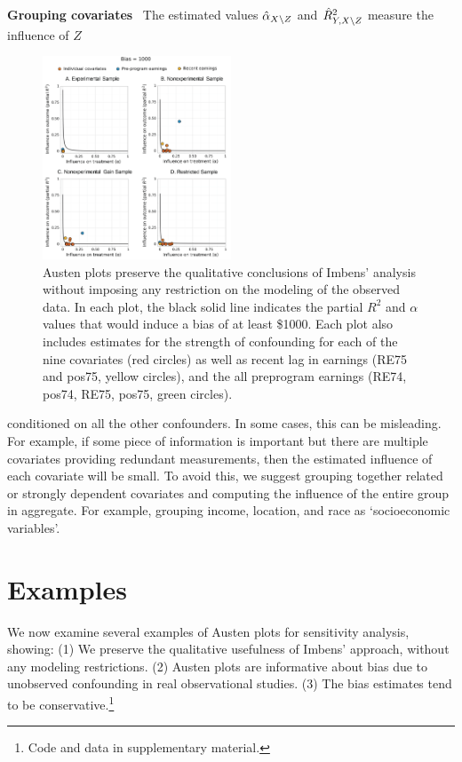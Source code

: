 \documentclass{article}
\DeclareRobustCommand{\parhead}[1]{\textbf{#1}~}
\begin{document}
\parhead{Grouping covariates} The estimated values $\hat{\alpha}_{X\backslash Z}$ and $\hat{R}_{Y,X\backslash Z}^{2}$ measure the influence of $Z$
\begin{figure}
   \vspace{-5pt}
  \begin{center}
    \includegraphics[width=0.5\textwidth]{figures/imbens_att.png}
  \end{center}
  \vspace{-5pt}
  \caption{Austen plots preserve the qualitative conclusions of Imbens' analysis without imposing any restriction on
    the modeling of the observed data. In each plot, the black solid line indicates the partial $R^2$ and $\alpha$ values that would induce a bias of at least \$1000. Each plot also includes estimates for the strength of confounding for  each of the nine covariates (red circles) as well as recent lag in earnings (RE75 and pos75, yellow circles), and the all preprogram earnings (RE74, pos74, RE75, pos75, green circles).  \label{fig:sensitivity-plots}}
   \vspace{-25pt}
 \end{figure}
conditioned on all the other confounders. In some cases, this can be misleading. For example, if some piece of information is important but there are multiple covariates providing redundant measurements, then the estimated influence of each covariate will be small.
To avoid this, we suggest grouping together related or strongly dependent covariates and computing the influence of the entire
group in aggregate. For example, grouping income, location, and race as `socioeconomic variables'. 

\section{Examples}
We now examine several examples of Austen plots for sensitivity analysis, showing:
(1) We preserve the qualitative usefulness of Imbens' approach, without any modeling restrictions.
(2) Austen plots are informative about bias due to unobserved confounding in real observational studies.
%
(3) The bias estimates tend to be conservative.\footnote{Code and data in supplementary material.}
%
\end{document}
